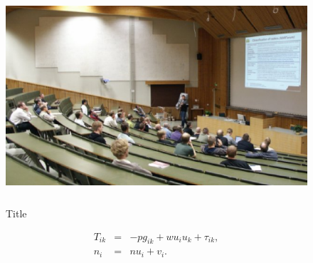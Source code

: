 \renewcommand{\theequation}{B\arabic{equation}}
\setcounter{equation}{0}  
\renewcommand{\thefigure}{B\arabic{figure}}
\setcounter{figure}{0}
\renewcommand{\thetable}{B\arabic{table}}
\setcounter{table}{0}

\begin{figure}[htb]
\begin{center}
\includegraphics[height=8cm]{charts/kuva2}
\end{center}
\caption{Title \label{liitekuva}}
\end{figure}

\begin{table}[htb]
\caption{table title \label{liitetaulukko}}
\begin{center}
\end{center}
\end{table}

\begin{eqnarray}
T_{ik} &=& -p g_{ik} + w u_i u_k + \tau_{ik},  \label{liitekaava3} \\
n_i    &=& n u_i + v_i.                        \label{liitekaava4}
\end{eqnarray}